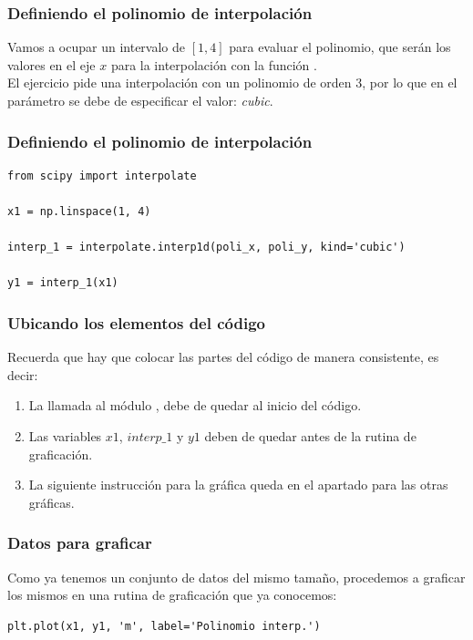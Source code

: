 \documentclass[12pt]{beamer}
\begin{document}
\begin{frame}[fragile]
\frametitle{Definiendo el polinomio de interpolación}
Vamos a ocupar un intervalo de $[1, 4]$ para evaluar el polinomio, que serán los valores en el eje $x$ para la interpolación con la función .
\\
\bigskip
\pause
El ejercicio pide una interpolación con un polinomio de orden $3$, por lo que en el parámetro  se debe de especificar el valor: \textit{cubic}.
\end{frame}
\begin{frame}[fragile]
\frametitle{Definiendo el polinomio de interpolación}
\begin{lstlisting}[caption=Definiendo el polinomio]
from scipy import interpolate

x1 = np.linspace(1, 4)

interp_1 = interpolate.interp1d(poli_x, poli_y, kind='cubic')

y1 = interp_1(x1)
\end{lstlisting}
\end{frame}
\begin{frame}
\frametitle{Ubicando los elementos del código}
Recuerda que hay que colocar las partes del código de manera consistente, es decir:
\begin{enumerate}[<+->]
\item La llamada al módulo , debe de quedar al inicio del código.
\item Las variables $x1$, $interp\_1$ y $y1$ deben de quedar antes de la rutina de graficación.
\item La siguiente instrucción para la gráfica queda en el apartado para las otras gráficas.
\end{enumerate}
\end{frame}
\begin{frame}[fragile]
\frametitle{Datos para graficar}
Como ya tenemos un conjunto de datos del mismo tamaño, procedemos a graficar los mismos en una rutina de graficación que ya conocemos:
\pause
\begin{lstlisting}[caption=Graficando los datos de interpolación]
plt.plot(x1, y1, 'm', label='Polinomio interp.')
\end{lstlisting}
\end{frame}
\end{document}
